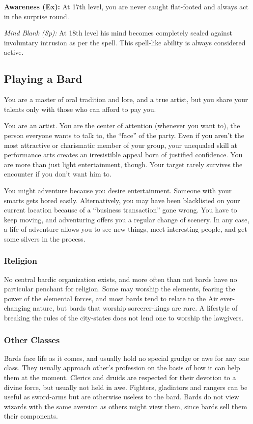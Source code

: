 \textbf{Awareness (Ex):} At 17th level, you are never caught flat-footed and always act in the surprise round.

\textit{Mind Blank (Sp):} At 18th level his mind becomes completely sealed against involuntary intrusion as per the  spell. This spell-like ability is always considered active.


\subsection{Playing a Bard}
You are a master of oral tradition and lore, and a true artist, but you share your talents only with those who can afford to pay you.

You are an artist. You are the center of attention (whenever you want to), the person everyone wants to talk to, the ``face'' of the party. Even if you aren't the most attractive or charismatic member of your group, your unequaled skill at performance arts creates an irresistible appeal born of justified confidence. You are more than just light entertainment, though. Your target rarely survives the encounter if you don't want him to.

You might adventure because you desire entertainment. Someone with your smarts gets bored easily. Alternatively, you may have been blacklisted on your current location because of a ``business transaction'' gone wrong. You have to keep moving, and adventuring offers you a regular change of scenery. In any case, a life of adventure allows you to see new things, meet interesting people, and get some silvers in the process.

\subsubsection{Religion}
No central bardic organization exists, and more often than not bards have no particular penchant for religion. Some may worship the elements, fearing the power of the elemental forces, and most bards tend to relate to the Air ever-changing nature, but bards that worship sorcerer-kings are rare. A lifestyle of breaking the rules of the city-states does not lend one to worship the lawgivers.

\subsubsection{Other Classes}
Bards face life as it comes, and usually hold no special grudge or awe for any one class. They usually approach other's profession on the basis of how it can help them at the moment. Clerics and druids are respected for their devotion to a divine force, but usually not held in awe. Fighters, gladiators and rangers can be useful as sword-arms but are otherwise useless to the bard. Bards do not view wizards with the same aversion as others might view them, since bards sell them their components.

